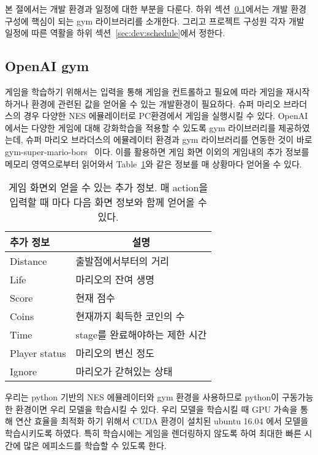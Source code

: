 
본 절에서는 개발 환경과 일정에 대한 부분을 다룬다.
하위 섹션~\ref{sec:dev:gym}에서는 개발 환경 구성에 핵심이 되는 gym 라이브러리를 소개한다.
그리고 프로젝트 구성원 각자 개발 일정에 따른 역활을 하위 섹션~\ref{sec:dev:schedule}에서 정한다.

\subsection{OpenAI gym}
\label{sec:dev:gym}
게임을 학습하기 위해서는 입력을 통해 게임을 컨트롤하고 필요에 따라 게임을 재시작하거나 환경에 관련된 값을 얻어올 수 있는 개발환경이 필요하다.
슈퍼 마리오 브라더스의 경우 다양한 NES 에뮬레이터로 PC환경에서 게임을 실행시킬 수 있다.
OpenAI에서는 다양한 게임에 대해 강화학습을 적용할 수 있도록 gym 라이브러리를 제공하였는데, 슈퍼 마리오 브라더스의 에뮬레이터 환경과 gym 라이브러리를 연동한 것이 바로 gym-super-mario-bors~\cite{GYMMario} 이다.
이를 활용하면 게임 화면 이외의 게임내의 추가 정보를 메모리 영역으로부터 읽어와서 Table~\ref{tab:mario:info}와 같은 정보를 매 상황마다 얻어올 수 있다.

\begin{table}[h]
	\caption {
		게임 화면외 얻을 수 있는 추가 정보. 매 action을 입력할 때 마다 다음 화면 정보와 함께 얻어올 수 있다.
	}
	\label{tab:mario:info}
\begin{tabular}{ll}
\toprule
추가 정보      & \multicolumn{1}{c}{설명} \\
\midrule
Distance       & 출발점에서부터의 거리 \\
Life           & 마리오의 잔여 생명 \\
Score          & 현재 점수 \\
Coins          & 현재까지 획득한 코인의 수 \\
Time           & stage를 완료해야하는 제한 시간 \\
Player status  & 마리오의 변신 정도 \\
Ignore         & 마리오가 갇혀있는 상태 \\
\bottomrule
\end{tabular}
\end{table}

우리는 python 기반의 NES 에뮬레이터와 gym 환경을 사용하므로 python이 구동가능한 환경이면 우리 모델을 학습시킬 수 있다.
우리 모델을 학습시킬 때 GPU 가속을 통해 연산 효율을 최적화 하기 위해서 CUDA 환경이 설치된 ubuntu 16.04 에서 모델을 학습시키도록 하였다.
특히 학습시에는 게임을 렌더링하지 않도록 하여 최대한 빠른 시간에 많은 에피소드를 학습할 수 있도록 한다.

